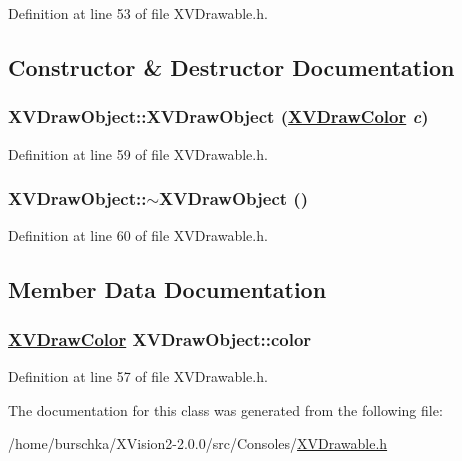Definition at line 53 of file XVDrawable.h.

\subsection{Constructor \& Destructor Documentation}
\label{XVDrawObject_a0}
\hypertarget{class_XVDrawObject_a0}{
\subsubsection[XVDrawObject]{\setlength{\rightskip}{0pt plus 5cm}XVDraw\-Object::XVDraw\-Object (\hyperlink{class_XVDrawColor}{XVDraw\-Color} {\em c})}}




Definition at line 59 of file XVDrawable.h.\label{XVDrawObject_a1}
\hypertarget{class_XVDrawObject_a1}{
\subsubsection[~XVDrawObject]{\setlength{\rightskip}{0pt plus 5cm}XVDraw\-Object::$\sim$XVDraw\-Object ()}}




Definition at line 60 of file XVDrawable.h.

\subsection{Member Data Documentation}
\label{XVDrawObject_m0}
\hypertarget{class_XVDrawObject_m0}{
\subsubsection[color]{\setlength{\rightskip}{0pt plus 5cm}\hyperlink{class_XVDrawColor}{XVDraw\-Color} XVDraw\-Object::color}}




Definition at line 57 of file XVDrawable.h.

The documentation for this class was generated from the following file:\begin{CompactItemize}
\item 
/home/burschka/XVision2-2.0.0/src/Consoles/\hyperlink{XVDrawable.h-source}{XVDrawable.h}\end{CompactItemize}
